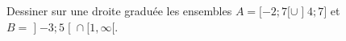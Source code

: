 
\begin{exercice}\label{exoPremiere-0021}
    
    Dessiner sur une droite graduée les ensembles \( A=\mathopen[ -2 ; 7 [\cup\mathopen] 4 ; 7 \mathclose]\) et \( B=\mathopen] -3 ; 5 \mathclose[\cap\mathopen[ 1 , \infty [\).

\end{exercice}
